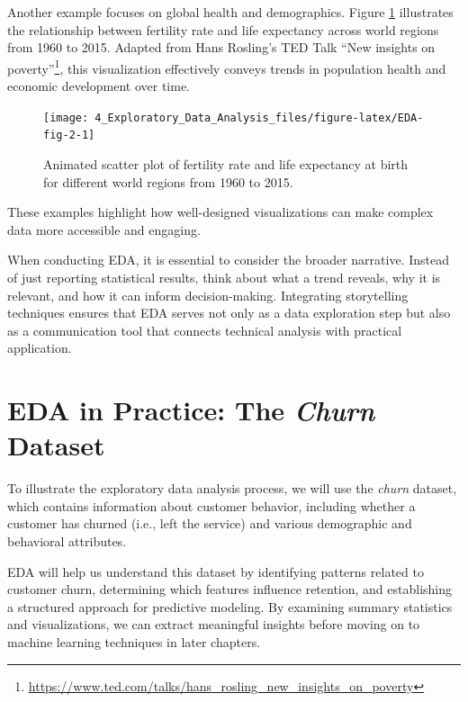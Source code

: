\documentclass[
  11pt,
]{book}
\renewcommand{\href}[2]{#2\footnote{\url{#1}}}
\theoremstyle{definition}
\theoremstyle{definition}
\theoremstyle{definition}
\theoremstyle{definition}
\theoremstyle{remark}
\begin{document}
Another example focuses on global health and demographics. Figure \ref{fig:EDA-fig-2} illustrates the relationship between fertility rate and life expectancy across world regions from 1960 to 2015. Adapted from Hans Rosling's TED Talk \href{https://www.ted.com/talks/hans_rosling_new_insights_on_poverty}{``New insights on poverty''}, this visualization effectively conveys trends in population health and economic development over time.

\begin{figure}[H]

{\centering \texttt{[image: 4\_Exploratory\_Data\_Analysis\_files/figure-latex/EDA-fig-2-1]} 

}

\caption{Animated scatter plot of fertility rate and life expectancy at birth for different world regions from 1960 to 2015.}\label{fig:EDA-fig-2}
\end{figure}

These examples highlight how well-designed visualizations can make complex data more accessible and engaging.

When conducting EDA, it is essential to consider the broader narrative. Instead of just reporting statistical results, think about what a trend reveals, why it is relevant, and how it can inform decision-making. Integrating storytelling techniques ensures that EDA serves not only as a data exploration step but also as a communication tool that connects technical analysis with practical application.

\section{\texorpdfstring{EDA in Practice: The \emph{Churn} Dataset}{EDA in Practice: The Churn Dataset}}\label{EDA-sec-churn}

To illustrate the exploratory data analysis process, we will use the \emph{churn} dataset, which contains information about customer behavior, including whether a customer has churned (i.e., left the service) and various demographic and behavioral attributes.

EDA will help us understand this dataset by identifying patterns related to customer churn, determining which features influence retention, and establishing a structured approach for predictive modeling. By examining summary statistics and visualizations, we can extract meaningful insights before moving on to machine learning techniques in later chapters.
\end{document}
